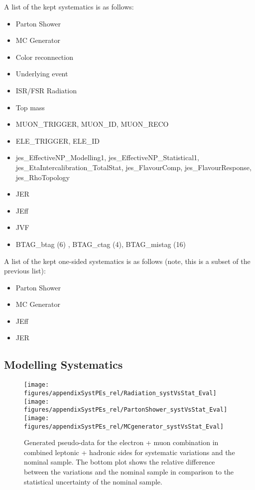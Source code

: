 A list of the kept systematics is as follows:
\begin{itemize}
\item Parton Shower
\item MC Generator
\item Color reconnection
\item Underlying event
\item ISR/FSR \ttbar Radiation
\item Top mass
\item MUON\_TRIGGER, MUON\_ID, MUON\_RECO
\item ELE\_TRIGGER, ELE\_ID
\item jes\_EffectiveNP\_Modelling1, jes\_EffectiveNP\_Statistical1, jes\_EtaIntercalibration\_TotalStat, jes\_FlavourComp, jes\_FlavourResponse, jes\_RhoTopology
\item JER
\item JEff
\item JVF
\item BTAG\_btag (6) , BTAG\_ctag (4), BTAG\_mistag (16)

\end{itemize}

A list of the kept one-sided systematics is as follows (note, this is a subset of the previous list):
\begin{itemize}
\item Parton Shower
\item MC Generator
\item JEff
\item JER
\end{itemize}

\subsection{Modelling Systematics}

\begin{figure}[!hb]
\begin{center}
        \texttt{[image: figures/appendixSystPEs\_rel/Radiation\_systVsStat\_Eval]}\\
        \texttt{[image: figures/appendixSystPEs\_rel/PartonShower\_systVsStat\_Eval]}\\
        \texttt{[image: figures/appendixSystPEs\_rel/MCgenerator\_systVsStat\_Eval]}
\caption{Generated pseudo-data for the electron + muon combination in combined leptonic + hadronic sides for systematic variations and the nominal \ttbar sample. The bottom plot shows the relative difference between the variations and the nominal sample in comparison to the statistical uncertainty of the nominal sample.}   
\label{fig:systematicVar_lephad_modelling_1}
\end{center}
\end{figure}

